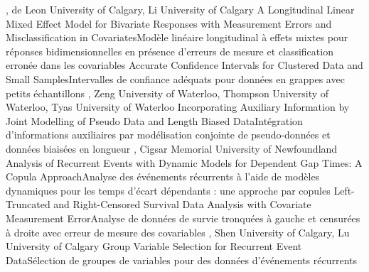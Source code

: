 {
,  {de Leon}
{University of Calgary},  {Li}
{University of Calgary}
}
{A Longitudinal Linear Mixed Effect Model for Bivariate Responses with Measurement Errors and Misclassification in Covariates}{Modèle linéaire longitudinal à effets mixtes pour réponses bidimensionnelles en présence d’erreurs de mesure et classification erronée dans les covariables}
{\bubbleE \enspace \screenE}
{
}
{Accurate Confidence Intervals for Clustered Data and Small Samples}{Intervalles de confiance adéquats pour données en grappes avec petits échantillons}
{\bubbleE \enspace \screenE}
{
,  {Zeng}
{University of Waterloo},  {Thompson}
{University of Waterloo},  {Tyas}
{University of Waterloo}
}
{Incorporating Auxiliary Information by Joint Modelling of Pseudo Data and Length Biased Data}{Intégration d’informations auxiliaires par modélisation conjointe de pseudo-données et données biaisées en longueur}
{\bubbleE \enspace \screenE}
{
,  {Cigsar}
{Memorial University of Newfoundland}
}
{Analysis of Recurrent Events with Dynamic Models for Dependent Gap Times: A Copula Approach}{Analyse des événements récurrents à l’aide de modèles dynamiques pour les temps d’écart dépendants : une approche par copules}
{\bubbleE \enspace \screenE}
{
}
{Left-Truncated and Right-Censored Survival Data Analysis with Covariate Measurement Error}{Analyse de données de survie tronquées à gauche et censurées à droite avec erreur de mesure des covariables}
{\bubbleE \enspace \screenE}
{
,  {Shen}
{University of Calgary},  {Lu}
{University of Calgary}
}
{Group Variable Selection for Recurrent Event Data}{Sélection de groupes de variables pour des données d’événements récurrents}
{\bubbleE \enspace \screenE}


